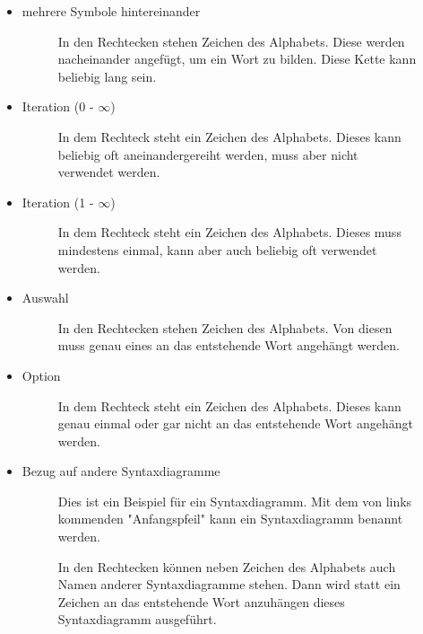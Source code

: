 \documentclass{article}
\begin{document}
	\begin{itemize}
		\item mehrere Symbole hintereinander
		\begin{figure}[H]
			\centering
			
			\caption{In den Rechtecken stehen Zeichen des Alphabets. Diese werden nacheinander angefügt, um ein Wort zu bilden. Diese Kette kann beliebig lang sein.}
		\end{figure}	
		\item Iteration (0 - $\infty$)
		\begin{figure}[H]
			\centering
			
			\caption{In dem Rechteck steht ein Zeichen des Alphabets. Dieses kann beliebig oft aneinandergereiht werden, muss aber nicht verwendet werden.}
		\end{figure}	
		\item Iteration (1 - $\infty$)
		\begin{figure}[H]
			\centering
			
			\caption{In dem Rechteck steht ein Zeichen des Alphabets. Dieses muss mindestens einmal, kann aber auch beliebig oft verwendet werden.}
		\end{figure}	
		\item Auswahl
		\begin{figure}[H]
			\centering
			
			\caption{In den Rechtecken stehen Zeichen des Alphabets. Von diesen muss genau eines an das entstehende Wort angehängt werden.}
		\end{figure}	
		\item Option
		\begin{figure}[H]
			\centering
			
			\caption{In dem Rechteck steht ein Zeichen des Alphabets. Dieses kann genau einmal oder gar nicht an das entstehende Wort angehängt werden.}
		\end{figure}	
		\item Bezug auf andere Syntaxdiagramme
		\begin{figure}[H]
			\centering
			
			\caption{Dies ist ein Beispiel für ein Syntaxdiagramm. Mit dem von links kommenden "Anfangspfeil" kann ein Syntaxdiagramm benannt werden.}
		\end{figure}	
		\begin{figure}[H]
			\centering
			
			\caption{In den Rechtecken können neben Zeichen des Alphabets auch Namen anderer Syntaxdiagramme stehen. Dann wird statt ein Zeichen an das entstehende Wort anzuhängen dieses Syntaxdiagramm ausgeführt.}
		\end{figure}	
	\end{itemize}
	
\end{document}
